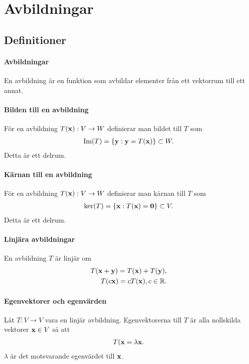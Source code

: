 \section{Avbildningar}

\subsection{Definitioner}

\paragraph{Avbildningar}
En avbildning är en funktion som avbildar elementer från ett vektorrum till ett annat.

\paragraph{Bilden till en avbildning}
För en avbildning $T(\vect{x}): V\to W$ definierar man bildet till $T$ som
\begin{align*}
	\Im{T} = \{\vect{y} : \vect{y} = T(\vect{x})\}\subset W.
\end{align*}
Detta är ett delrum.

\paragraph{Kärnan till en avbildning}
För en avbildning $T(\vect{x}): V\to W$ definierar man kärnan till $T$ som
\begin{align*}
	\ker{T} = \{\vect{x} : T(\vect{x})= \vect{0}\}\subset V.
\end{align*}
Detta är ett delrum.

\paragraph{Linjära avbildningar}
En avbildning $T$ är linjär om
\begin{align*}
	T(\vect{x} + \vect{y}) = T(\vect{x}) + T(\vect{y}), \\
	T(c\vect{x}) = cT(\vect{x}), c\in\R.
\end{align*}

\paragraph{Egenvektorer och egenvärden}\label{par:eigen_values}
Låt $T: V\to V$ vara en linjär avbildning. Egenvektorerna till $T$ är alla nollskilda vektorer $\vect{x}\in V$ så att
\begin{align*}
	T(\vect{x} = \lambda\vect{x}.
\end{align*}
$\lambda$ är det motsvarande egenvärdet till $\vect{x}$.

